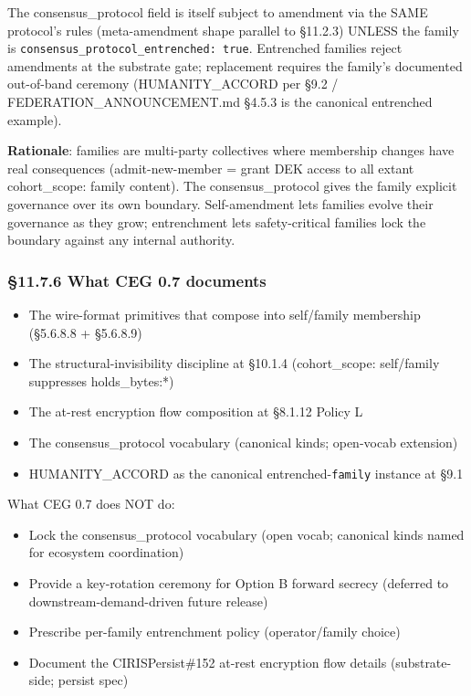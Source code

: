\documentclass[11pt]{article}
\begin{document}
The consensus\_protocol field is itself subject to amendment via the SAME protocol's rules (meta-amendment shape parallel to §11.2.3) UNLESS the family is \texttt{consensus\_protocol\_entrenched: true}. Entrenched families reject amendments at the substrate gate; replacement requires the family's documented out-of-band ceremony (HUMANITY\_ACCORD per §9.2 / FEDERATION\_ANNOUNCEMENT.md §4.5.3 is the canonical entrenched example).


\textbf{Rationale}: families are multi-party collectives where membership changes have real consequences (admit-new-member = grant DEK access to all extant cohort\_scope: family content). The consensus\_protocol gives the family explicit governance over its own boundary. Self-amendment lets families evolve their governance as they grow; entrenchment lets safety-critical families lock the boundary against any internal authority.


\subsubsection*{§11.7.6 What CEG 0.7 documents}


\begin{itemize}\setlength\itemsep{0pt}
\item The wire-format primitives that compose into self/family membership (§5.6.8.8 + §5.6.8.9)
\item The structural-invisibility discipline at §10.1.4 (cohort\_scope: self/family suppresses holds\_bytes:*)
\item The at-rest encryption flow composition at §8.1.12 Policy L
\item The consensus\_protocol vocabulary (canonical kinds; open-vocab extension)
\item HUMANITY\_ACCORD as the canonical entrenched-\texttt{family} instance at §9.1
\end{itemize}


What CEG 0.7 does NOT do:

\begin{itemize}\setlength\itemsep{0pt}
\item Lock the consensus\_protocol vocabulary (open vocab; canonical kinds named for ecosystem coordination)
\item Provide a key-rotation ceremony for Option B forward secrecy (deferred to downstream-demand-driven future release)
\item Prescribe per-family entrenchment policy (operator/family choice)
\item Document the CIRISPersist\#152 at-rest encryption flow details (substrate-side; persist spec)
\end{itemize}
\end{document}
